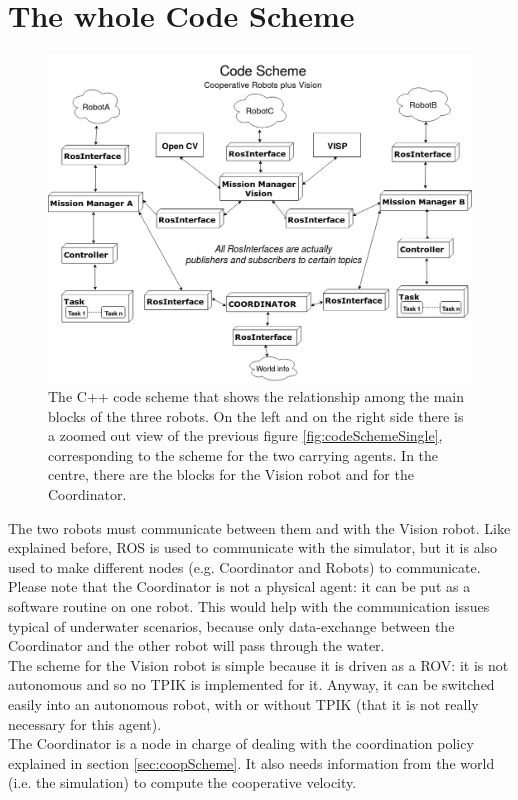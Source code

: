 \section{The whole Code Scheme}
\begin{figure}[H]
	\begin{center}
		\includegraphics[width=1\columnwidth]{CodeScheme.png}
		\caption[C++ Code Scheme for the whole architecture]{The C++ code scheme that shows the relationship among the main blocks of the three robots. On the left and on the right side there is a zoomed out view of the previous figure \ref{fig:codeSchemeSingle}, corresponding to the scheme for the two carrying agents. In the centre, there are the blocks for the Vision robot and for the Coordinator.}
		\label{fig:codeSchemeWhole}
	\end{center}
\end{figure}
	
The two robots must communicate between them and with the Vision robot. Like explained before, ROS is used to communicate with the simulator, but it is also used to make different nodes (e.g. Coordinator and Robots) to communicate.\\
Please note that the Coordinator is not a physical agent: it can be put as a software routine on one robot. This would help with the communication issues typical of underwater scenarios, because only data-exchange between the Coordinator and the other robot will pass through the water.\\
The scheme for the Vision robot is simple because it is driven as a ROV: it is not autonomous and so no TPIK is implemented for it. Anyway, it can be switched easily into an autonomous robot, with or without TPIK (that it is not really necessary for this agent).\\
The Coordinator is a node in charge of dealing with the coordination policy explained in section \ref{sec:coopScheme}. It also needs information from the world (i.e. the simulation) to compute the cooperative velocity.
